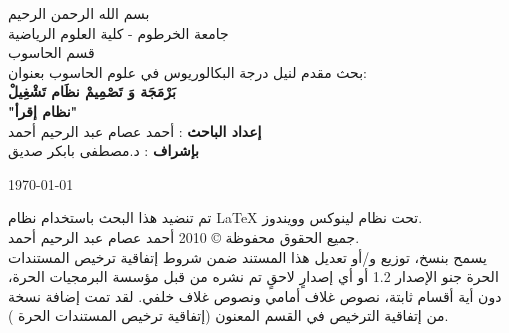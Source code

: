 \begin{titlepage}

\begin{center}

 بسم الله الرحمن الرحيم\\[0.8cm] 


جامعة الخرطوم - كلية العلوم الرياضية \\ قسم الحاسوب \\ [5cm]

\textsc{\Large بحث مقدم لنيل درجة البكالوريوس في علوم الحاسوب بعنوان:}\\[0.9cm]



{ \huge \textbf{بَرْمَجَة وَ تَصْمِيمْ نظَام تَشْغِيلْ\\[0.3cm] \large{"نظام إقرأ"}}}\\[3cm]




\textbf{إعداد الباحث} : أحمد عصام عبد الرحيم أحمد \\
\textbf{بإشراف} : د.مصطفى بابكر صديق



\vfill

{\large \today}

\end{center}

\clearpage
\thispagestyle{empty}

{ \phantom{.} \vspace{400pt} }
{\footnotesize
تم تنضيد هذا البحث باستخدام نظام  \LaTeX  {} تحت نظام لينوكس وويندوز.\\
جميع الحقوق محفوظة \copyright  {} 2010 أحمد عصام عبد الرحيم أحمد.\\

يسمح بنسخ، توزيع و/أو تعديل هذا المستند ضمن شروط إتفاقية ترخيص المستندات الحرة جنو الإصدار  1.2 أو أي إصدارٍ لاحقٍ تم نشره من قبل مؤسسة البرمجيات الحرة، دون أية أقسام ثابتة، نصوص غلاف  أمامي ونصوص غلاف خلفي. لقد تمت إضافة نسخة من إتفاقية الترخيص في القسم المعنون (إتفاقية  ترخيص المستندات الحرة ).
}

\end{titlepage}